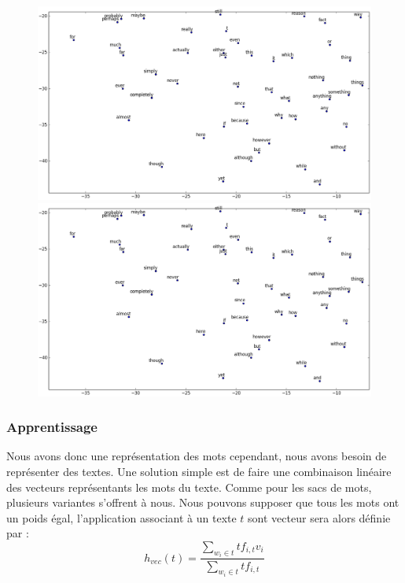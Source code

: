 \documentclass{article}
\begin{document}
\begin{figure}[h]
\begin{center}
\includegraphics[scale=0.35]{images/cluster_cinema.png} \\
\includegraphics[scale=0.35]{images/cluster_toolwords.png}
\label{clusters}
\end{center}
\end{figure}

\subsubsection{Apprentissage}

Nous avons donc une représentation des mots cependant, nous avons besoin de représenter des textes. Une solution simple est de faire une combinaison linéaire des vecteurs représentants les mots du texte. Comme pour les sacs de mots, plusieurs variantes s'offrent à nous. Nous pouvons supposer que tous les mots ont un poids égal, l'application associant à un texte $t$ sont vecteur sera alors définie par :
$$
h_{vec}(t) = \frac{\sum_{w_{i} \in t}{tf_{i, t}v_{i}}}{\sum_{w_{i} \in t}{tf_{i, t}}} 
$$
\end{document}
